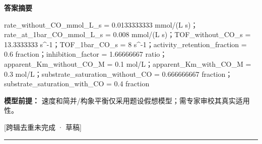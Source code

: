 \documentclass[UTF8,11pt,a4paper]{ctexart}
\begin{document}
\noindent\textbf{答案摘要}\par
rate\_without\_CO\_mmol\_L\_s = 0.0133333333 mmol/(L s)；rate\_at\_1bar\_CO\_mmol\_L\_s = 0.008 mmol/(L s)；TOF\_without\_CO\_s = 13.3333333 s\textasciicircum{}-1；TOF\_1bar\_CO\_s = 8 s\textasciicircum{}-1；activity\_retention\_fraction = 0.6 fraction；inhibition\_factor = 1.66666667 ratio；apparent\_Km\_without\_CO\_M = 0.1 mol/L；apparent\_Km\_with\_CO\_M = 0.3 mol/L；substrate\_saturation\_without\_CO = 0.666666667 fraction；substrate\_saturation\_with\_CO = 0.4 fraction\par
\noindent\textbf{模型前提：}
速度和简并/构象平衡仅采用题设假想模型；需专家审校其真实适用性。\par
\noindent\textcolor{red!65!black}{[跨辑去重未完成 · 草稿]} \par
\medskip\hrule\medskip
{}
\end{document}
